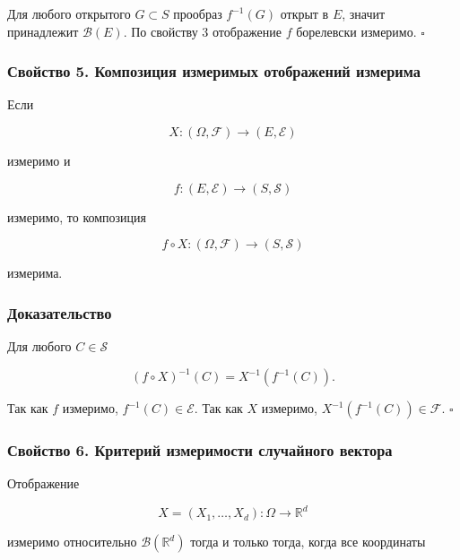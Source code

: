 \documentclass[
  11pt,
  a4paper,
]{article}
\begin{document}
Для любого открытого \(G\subset S\) прообраз \(f^{-1}(G)\) открыт в
\(E\), значит принадлежит \(\mathcal B(E)\). По свойству 3 отображение
\(f\) борелевски измеримо. \(\square\)

\subsubsection{Свойство 5. Композиция измеримых отображений
измерима}\label{ux441ux432ux43eux439ux441ux442ux432ux43e-5.-ux43aux43eux43cux43fux43eux437ux438ux446ux438ux44f-ux438ux437ux43cux435ux440ux438ux43cux44bux445-ux43eux442ux43eux431ux440ux430ux436ux435ux43dux438ux439-ux438ux437ux43cux435ux440ux438ux43cux430}

Если

\[
X:(\Omega,\mathcal F)\to(E,\mathcal E)
\]

измеримо и

\[
f:(E,\mathcal E)\to(S,\mathcal S)
\]

измеримо, то композиция

\[
f\circ X:(\Omega,\mathcal F)\to(S,\mathcal S)
\]

измерима.

\subsubsection{Доказательство}\label{ux434ux43eux43aux430ux437ux430ux442ux435ux43bux44cux441ux442ux432ux43e-3}

Для любого \(C\in\mathcal S\)

\[
(f\circ X)^{-1}(C)=X^{-1}(f^{-1}(C)).
\]

Так как \(f\) измеримо, \(f^{-1}(C)\in\mathcal E\). Так как \(X\)
измеримо, \(X^{-1}(f^{-1}(C))\in\mathcal F\). \(\square\)

\subsubsection{Свойство 6. Критерий измеримости случайного
вектора}\label{ux441ux432ux43eux439ux441ux442ux432ux43e-6.-ux43aux440ux438ux442ux435ux440ux438ux439-ux438ux437ux43cux435ux440ux438ux43cux43eux441ux442ux438-ux441ux43bux443ux447ux430ux439ux43dux43eux433ux43e-ux432ux435ux43aux442ux43eux440ux430}

Отображение

\[
X=(X_1,\ldots,X_d):\Omega\to\mathbb R^d
\]

измеримо относительно \(\mathcal B(\mathbb R^d)\) тогда и только тогда,
когда все координаты
\end{document}
